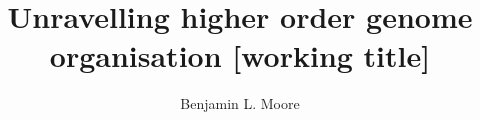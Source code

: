 \documentclass[a4paper,10pt,oneside]{book}
\title{ \vspace{3in} Unravelling higher order genome organisation {\small [working
    title]} \\ \vspace{2em} }
\author{Benjamin L. Moore}
\begin{document}
\maketitle

\tableofcontents











%





\begin{small}

\end{small}
\end{document}
